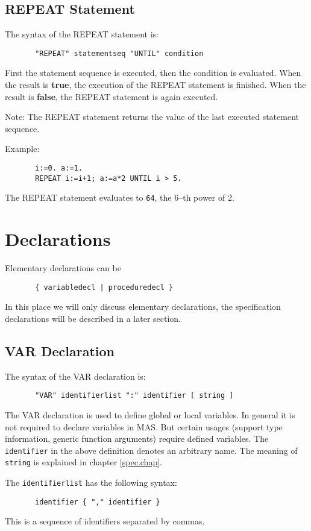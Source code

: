 \subsection{REPEAT Statement}
   
The syntax of the REPEAT statement is:
\begin{verbatim}
       "REPEAT" statementseq "UNTIL" condition
\end{verbatim}
First the statement sequence is executed, then
the condition is evaluated. When the result is {\bf true},
the execution of the REPEAT statement is finished. 
When the result is {\bf false}, the REPEAT statement is
again executed. 

Note: The REPEAT statement returns the value of the 
last executed statement sequence.

Example:
\begin{verbatim}
       i:=0. a:=1.
       REPEAT i:=i+1; a:=a*2 UNTIL i > 5.
\end{verbatim}
The REPEAT statement evaluates to \verb/64/, the
6--th power of 2.


\section{Declarations}

Elementary declarations can be
\begin{verbatim}
       { variabledecl | proceduredecl }
\end{verbatim}
In this place we will only discuss elementary 
declarations, the specification declarations 
will be described in a later section.


\subsection{VAR Declaration}
   
The syntax of the VAR declaration is:
\begin{verbatim}
       "VAR" identifierlist ":" identifier [ string ]
\end{verbatim}
The VAR declaration is used to define global or local
variables. In general it is not required to
declare variables in MAS. But certain usages
(support type information, generic function arguments)
require defined variables.
The \verb/identifier/ in the above definition 
denotes an arbitrary name. The meaning of \verb/string/
is explained in chapter \ref{spec.chap}.

The \verb/identifierlist/ has the following syntax:
\begin{verbatim}
       identifier { "," identifier }
\end{verbatim}
This is a sequence of identifiers separated by commas.


